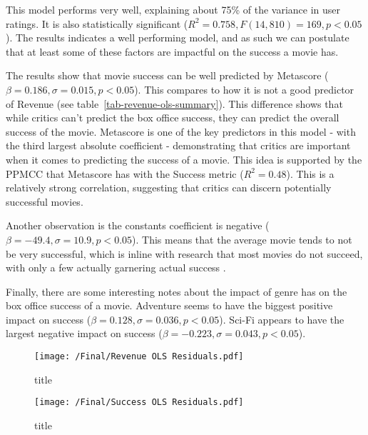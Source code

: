                 This model performs very well, explaining about 75\% of the variance in user
                ratings.
            It is also statistically significant ($R^2=0.758, F(14,810)=169, p<0.05$).
            The results indicates a well performing model, and as such we can postulate
                that at least some of these factors are impactful on the success a movie has.

            The results show that movie success can be well predicted by Metascore
                ($\beta=0.186, \sigma=0.015, p<0.05$).
            This compares to how it is not a good predictor of Revenue (see
                table~\ref{tab-revenue-ols-summary}).
            This difference shows that while critics can't predict the box office success,
                they can predict the overall success of the movie.
            Metascore is one of the key predictors in this model - with the third largest
                absolute coefficient - demonstrating that critics are important when it comes
                to predicting the success of a movie.
            This idea is supported by the PPMCC that Metascore has with the Success metric
                ($R^2=0.48$).
            This is a relatively strong correlation, suggesting that critics can discern
                potentially successful movies.

            Another observation is the constants coefficient is negative
                ($\beta=-49.4,\sigma=10.9,p<0.05$).
            This means that the average movie tends to not be very successful, which is
                inline with research that most movies do not succeed, with only a few actually
                garnering actual success \cite{walls2005modelling}.

            Finally, there are some interesting notes about the impact of genre has on the
                box office success of a movie.
            Adventure seems to have the biggest positive impact on success
                ($\beta=0.128,\sigma=0.036,p<0.05$).
            Sci-Fi appears to have the largest negative impact on success
                ($\beta=-0.223,\sigma=0.043,p<0.05$).

            \begin{figure}[H]
                \texttt{[image: /Final/Revenue OLS Residuals.pdf]}
                \caption[short]{title}\label{fig-revenue-ols-residuals}
            \end{figure}

            \begin{figure}[H]
                \texttt{[image: /Final/Success OLS Residuals.pdf]}
                \caption[short]{title}\label{fig-success-ols-residuals}
            \end{figure}
